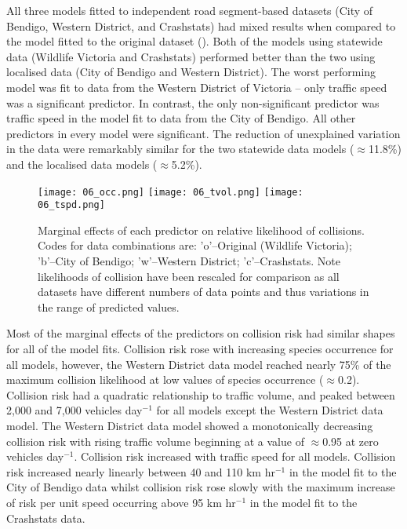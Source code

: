 All three models fitted to independent road segment-based datasets (City of Bendigo, Western District, and Crashstats) had mixed results when compared to the model fitted to the original dataset (). Both of the models using statewide data (Wildlife Victoria and Crashstats) performed better than the two using localised data (City of Bendigo and Western District). The worst performing model was fit to data from the Western District of Victoria -- only traffic speed was a significant predictor. In contrast, the only non-significant predictor was traffic speed in the model fit to data from the City of Bendigo. All other predictors in every model were significant. The reduction of unexplained variation in the data were remarkably similar for the two statewide data models ($\approx$11.8\%) and the localised data models ($\approx$5.2\%).

\begin{figure*}[!t]
  \centering
  \texttt{[image: 06\_occ.png]}
  \texttt{[image: 06\_tvol.png]}
  \texttt{[image: 06\_tspd.png]}
  \caption[Marginal effects of predictor variables on relative likelihood of collision using independent datasets to train models]{Marginal effects of each predictor on relative likelihood of collisions. Codes for data combinations are: 'o'--Original (Wildlife Victoria); 'b'--City of Bendigo; 'w'--Western District; 'c'--Crashstats. Note likelihoods of collision have been rescaled for comparison as all datasets have different numbers of data points and thus variations in the range of predicted values.}
  \label{val_effects}
\end{figure*}

Most of the marginal effects of the predictors on collision risk had similar shapes for all of the model fits. Collision risk rose with increasing species occurrence for all models, however, the Western District data model reached nearly 75\% of the maximum collision likelihood at low values of species occurrence ($\approx$0.2). Collision risk had a quadratic relationship to traffic volume, and peaked between 2,000 and 7,000 vehicles day$^{-1}$ for all models except the Western District data model. The Western District data model showed a monotonically decreasing collision risk with rising traffic volume beginning at a value of $\approx$0.95 at zero vehicles day$^{-1}$. Collision risk increased with traffic speed for all models. Collision risk increased nearly linearly between 40 and 110 km hr$^{-1}$ in the model fit to the City of Bendigo data whilst collision risk rose slowly with the maximum increase of risk per unit speed occurring above 95 km hr$^{-1}$ in the model fit to the Crashstats data.


